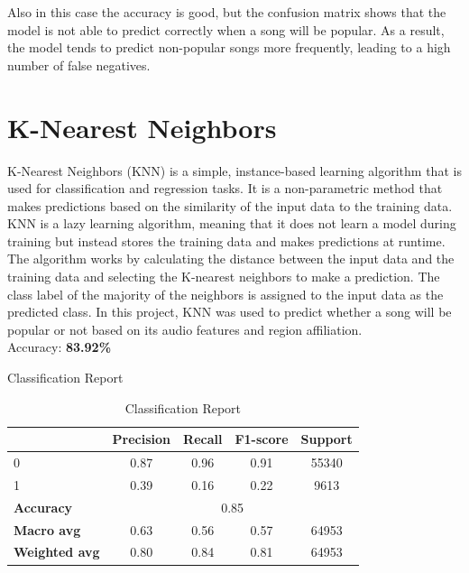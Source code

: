 Also in this case the accuracy is good, but the confusion matrix shows that the model is not able to predict correctly when a song will be popular. As a result, the model tends to predict non-popular songs more frequently, leading to a high number of false negatives.

\newpage


\section{K-Nearest Neighbors}

K-Nearest Neighbors (KNN) is a simple, instance-based learning algorithm that is used for classification and regression tasks. It is a non-parametric method that makes predictions based on the similarity of the input data to the training data. KNN is a lazy learning algorithm, meaning that it does not learn a model during training but instead stores the training data and makes predictions at runtime. The algorithm works by calculating the distance between the input data and the training data and selecting the K-nearest neighbors to make a prediction. The class label of the majority of the neighbors is assigned to the input data as the predicted class. In this project, KNN was used to predict whether a song will be popular or not based on its audio features and region affiliation. \\

Accuracy: \textbf{83.92\%}


Classification Report
\begin{table}[h]
    \centering
    \begin{tabular}{lcccc}
        \toprule
        & \textbf{Precision} & \textbf{Recall} & \textbf{F1-score} & \textbf{Support} \\
        \midrule
        0 & 0.87 & 0.96 & 0.91 & 55340 \\
        1 & 0.39 & 0.16 & 0.22 & 9613 \\
        \midrule
        \textbf{Accuracy} & \multicolumn{4}{c}{0.85} \\
        \textbf{Macro avg} & 0.63 & 0.56 & 0.57 & 64953 \\
        \textbf{Weighted avg} & 0.80 & 0.84 & 0.81 & 64953 \\
        \bottomrule
    \end{tabular}
    \caption{Classification Report}
    \label{tab:classification_report}
\end{table}

